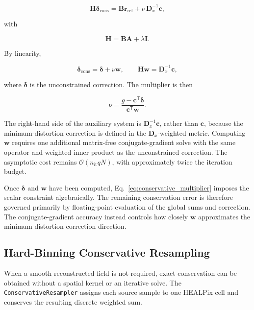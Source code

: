 \documentclass[journal]{IEEEtran}
\newcommand{\healpix}{HEALPix\xspace}
\begin{document}
\begin{equation}
\mathbf H\boldsymbol\delta_{\mathrm{cons}}
=
\mathbf B\mathbf r_{\mathrm{ref}}
+
\nu\,\mathbf D_x^{-1}\mathbf c,
\label{eq:constrained_system}
\end{equation}

with

\begin{equation}
\mathbf H=\mathbf B\mathbf A+\lambda\mathbf I.
\end{equation}

By linearity,

\begin{equation}
\boldsymbol\delta_{\mathrm{cons}}
=
\boldsymbol\delta+\nu\mathbf w,
\qquad
\mathbf H\mathbf w=\mathbf D_x^{-1}\mathbf c,
\end{equation}

where $\boldsymbol\delta$ is the unconstrained correction. The
multiplier is then

\begin{equation}
\nu
=
\frac{
g-\mathbf c^{\mathsf T}\boldsymbol\delta
}{
\mathbf c^{\mathsf T}\mathbf w
}.
\label{eq:conservative_multiplier}
\end{equation}

The right-hand side of the auxiliary system is
$\mathbf D_x^{-1}\mathbf c$, rather than $\mathbf c$, because the
minimum-distortion correction is defined in the
$\mathbf D_x$-weighted metric. Computing $\mathbf w$ requires one
additional matrix-free conjugate-gradient solve with the same
operator and weighted inner product as the unconstrained
correction. The asymptotic cost remains
$\mathcal O(n_{\mathrm{it}}qN)$, with approximately twice the
iteration budget.

Once $\boldsymbol\delta$ and $\mathbf w$ have been computed,
Eq.~\eqref{eq:conservative_multiplier} imposes the scalar
constraint algebraically. The remaining conservation error is
therefore governed primarily by floating-point evaluation of the
global sums and correction. The conjugate-gradient accuracy
instead controls how closely $\mathbf w$ approximates the
minimum-distortion correction direction.

\subsection{Hard-Binning Conservative Resampling}
\label{sec:hard_binning}

When a smooth reconstructed field is not required, exact
conservation can be obtained without a spatial kernel or an
iterative solve. The
\texttt{ConservativeResampler} assigns each source sample to one
\healpix cell and conserves the resulting discrete weighted sum.
\end{document}
